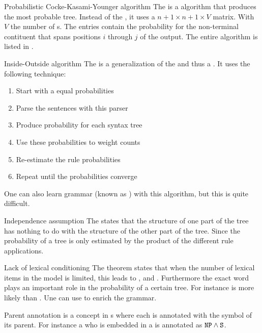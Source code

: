 \begin{df}[PCKY]{Probabilistic Cocke-Kasami-Younger algorithm}
The\sb{} is a  algorithm that produces the most probable tree. Instead of the , it uses a $n+1\times n+1\times V$ matrix. With $V$ the number of s. The entries contain the probability for the non-terminal contituent that spans positions $i$ through $j$ of the output. The entire algorithm is listed in .
\end{df}
\begin{df}{Inside-Outside algorithm}
The \sb{} is a generalization of the  and thus a . It uses the following technique:
\begin{enumerate}
 \item Start with a equal probabilities
 \item Parse the sentences with this parser
 \item Produce probability for each syntax tree
 \item Use these probabilities to weight counts
 \item Re-estimate the rule probabilities
 \item Repeat until the probabilities converge
\end{enumerate}
One can also learn grammar (known as ) with this algorithm, but this is quite difficult.
\end{df}
\begin{tm}{Independence assumption}
The \sb{} states that the structure of one part of the tree has nothing to do with the structure of the other part of the tree. Since the probability of a tree is only estimated by the product of the different rule applications.
\end{tm}
\begin{tm}{Lack of lexical conditioning}
The \sb{} theorem states that when the number of lexical items in the model is limited, this leads to ,  and . Furthermore the exact word plays an important role in the probability of a certain tree. For instance  is more likely than . Une can use  to enrich the grammar.
\end{tm}
\begin{df}{Parent annotation}
\sb{} is a concept in s where each  is annotated with the symbol of its parent. For instance a  who is embedded in a  is annotated as $\mbox{\texttt{NP}}\wedge\mbox{\texttt{S}}$.
\end{df}
